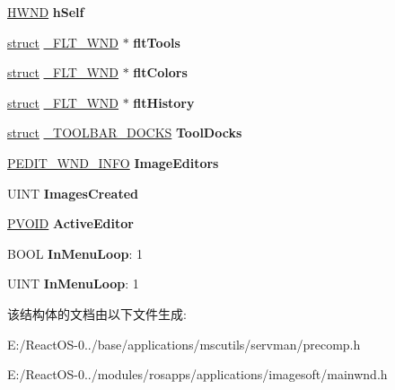 \begin{DoxyCompactItemize}
\mbox{\label{struct___m_a_i_n___w_n_d___i_n_f_o_af736f810e4685cf3b096c0c4f0e19829}} 
\hyperlink{interfacevoid}{H\+W\+ND} {\bfseries h\+Self}
\item 
\mbox{\label{struct___m_a_i_n___w_n_d___i_n_f_o_afa9adb685651cf90c0437b3951523deb}} 
\hyperlink{interfacestruct}{struct} \hyperlink{struct___f_l_t___w_n_d}{\+\_\+\+F\+L\+T\+\_\+\+W\+ND} $\ast$ {\bfseries flt\+Tools}
\item 
\mbox{\label{struct___m_a_i_n___w_n_d___i_n_f_o_a621e847d8cee511359264d51ed98bce0}} 
\hyperlink{interfacestruct}{struct} \hyperlink{struct___f_l_t___w_n_d}{\+\_\+\+F\+L\+T\+\_\+\+W\+ND} $\ast$ {\bfseries flt\+Colors}
\item 
\mbox{\label{struct___m_a_i_n___w_n_d___i_n_f_o_a0c3c34abf3ff99817a4e718739c7dac2}} 
\hyperlink{interfacestruct}{struct} \hyperlink{struct___f_l_t___w_n_d}{\+\_\+\+F\+L\+T\+\_\+\+W\+ND} $\ast$ {\bfseries flt\+History}
\item 
\mbox{\label{struct___m_a_i_n___w_n_d___i_n_f_o_aa56a86312c9aa0f9a38f41790a3cbfeb}} 
\hyperlink{interfacestruct}{struct} \hyperlink{struct___t_o_o_l_b_a_r___d_o_c_k_s}{\+\_\+\+T\+O\+O\+L\+B\+A\+R\+\_\+\+D\+O\+C\+KS} {\bfseries Tool\+Docks}
\item 
\mbox{\label{struct___m_a_i_n___w_n_d___i_n_f_o_a955177ce2ebce6d26934f8af6c799fa0}} 
\hyperlink{struct___e_d_i_t___w_n_d___i_n_f_o}{P\+E\+D\+I\+T\+\_\+\+W\+N\+D\+\_\+\+I\+N\+FO} {\bfseries Image\+Editors}
\item 
\mbox{\label{struct___m_a_i_n___w_n_d___i_n_f_o_ab51d90dddac7b300e8190910e5bba0eb}} 
U\+I\+NT {\bfseries Images\+Created}
\item 
\mbox{\label{struct___m_a_i_n___w_n_d___i_n_f_o_ae252fd71805a1cd9c7733ebfec2cca65}} 
\hyperlink{interfacevoid}{P\+V\+O\+ID} {\bfseries Active\+Editor}
\item 
\mbox{\label{struct___m_a_i_n___w_n_d___i_n_f_o_a8fdc8583e3201eae4f325e42dbb22c2f}} 
B\+O\+OL {\bfseries In\+Menu\+Loop}\+: 1
\item 
\mbox{\label{struct___m_a_i_n___w_n_d___i_n_f_o_a00602ffe97ff01feaef10487dab4ce6d}} 
U\+I\+NT {\bfseries In\+Menu\+Loop}\+: 1
\end{DoxyCompactItemize}


该结构体的文档由以下文件生成\+:\begin{DoxyCompactItemize}
\item 
E\+:/\+React\+O\+S-\/0../base/applications/mscutils/servman/precomp.\+h\item 
E\+:/\+React\+O\+S-\/0../modules/rosapps/applications/imagesoft/mainwnd.\+h\end{DoxyCompactItemize}
